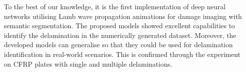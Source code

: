 \begin{sloppypar}
	To the best of our knowledge, it is the first implementation of deep neural networks utilising Lamb wave propagation animations for damage imaging with semantic segmentation. 
	The proposed models showed excellent capabilities to identify the delamination in the numerically generated dataset.
	Moreover, the developed models can generalise so that they could be used for delamination identification in real-world scenarios.
	This is confirmed through the experiment on CFRP plates with single and multiple delaminations.
\end{sloppypar}


